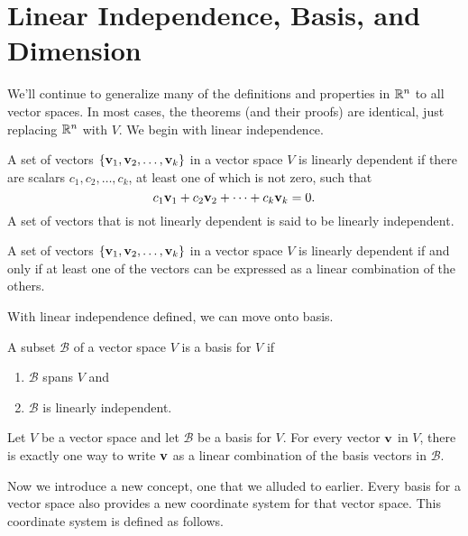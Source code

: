 \documentclass[../m73main.tex]{subfiles}
\begin{document}
\section{Linear Independence, Basis, and Dimension}
We'll continue to generalize many of the definitions and properties in $\mathbb{R}^n$ to all vector spaces.
In most cases, the theorems (and their proofs) are identical, just replacing $\mathbb{R}^n$ with $V$.
We begin with linear independence.

\begin{definition}
	A set of vectors $\{\mathbf{v}_1, \mathbf{v}_2, \ldots, \mathbf{v}_k\}$ in a vector space $V$ is linearly dependent if there are scalars $c_1, c_2, \ldots, c_k$, at least one of which is not zero, such that
	\[ c_1 \mathbf{v}_1 + c_2 \mathbf{v}_2 + \cdots + c_k \mathbf{v}_k = 0. \]
	A set of vectors that is not linearly dependent is said to be linearly independent.
\end{definition}

\begin{theorem}
	A set of vectors $\{\mathbf{v}_1, \mathbf{v}_2, \ldots, \mathbf{v}_k\}$ in a vector space $V$ is linearly dependent if and only if at least one of the vectors can be expressed as a linear combination of the others.
\end{theorem}

With linear independence defined, we can move onto basis.

\begin{definition}[Basis]
	A subset $\mathcal{B}$ of a vector space $V$ is a basis for $V$ if
	\begin{enumerate}
		\item $\mathcal{B}$ spans $V$ and
		\item $\mathcal{B}$ is linearly independent.
	\end{enumerate}
\end{definition}

\begin{theorem}
	Let $V$ be a vector space and let $\mathcal{B}$ be a basis for $V$.
	For every vector $\mathbf{v}$ in $V$, there is exactly one way to write $\mathbf{v}$ as a linear combination of the basis vectors in $\mathcal{B}$.
\end{theorem}

Now we introduce a new concept, one that we alluded to earlier.
Every basis for a vector space also provides a new coordinate system for that vector space.
This coordinate system is defined as follows.
\end{document}
